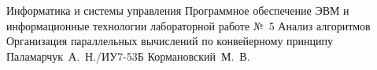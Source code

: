 
\makereporttitle
    {Информатика и системы управления} %
    {Программное обеспечение ЭВМ и информационные технологии} %
    {лабораторной работе №~5} %
    {Анализ алгоритмов} %
    {Организация параллельных вычислений по конвейерному принципу} %
    {} %
    {Паламарчук~А.~Н./ИУ7-53Б} %
    {Кормановский~М.~В.} %

